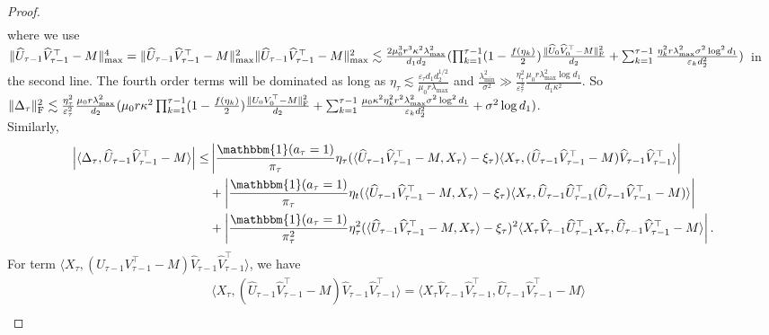 \documentclass[12pt]{article}
\newcommand\fro[1]{\| #1 \|_{\rm{F}}}
\newcommand{\inp}[2]{\langle #1,#2\rangle}
\theoremstyle{plain}
\begin{document}
\begin{proof}
\begin{align*}
    \end{align*}
    where we use $\|\widehat{U}_{\tau-1}\widehat{V}_{\tau-1}^{\top}-M\|_{\max}^4=\|\widehat{U}_{\tau-1}\widehat{V}_{\tau-1}^{\top}-M\|_{\max}^2 \|\widehat{U}_{\tau-1}\widehat{V}_{\tau-1}^{\top}-M\|_{\max}^2\lesssim \frac{2\mu_0^3 r^3\kappa^2 \lambda_{\max}^2}{d_1d_2}(\prod_{k=1}^{\tau-1} (1-\frac{f(\eta_k)}{2})\frac{\fro{\widehat{U}_0\widehat{V}_0^{\top}-M}^2}{d_2} + \sum_{k=1}^{\tau-1}\frac{\eta_k^2r\lambda_{\max}^2\sigma^2\log^2d_1}{\varepsilon_k d_2^2})$ in the second line. The fourth order terms will be dominated as long as $\eta_\tau\lesssim \frac{\varepsilon_\tau d_1d_2^{1/2}}{\mu_0r \lambda_{\max}}$ and $\frac{\lambda_{\min}^2}{\sigma^2}\gg \frac{\eta_{\tau}^2}{\varepsilon_{\tau}^2}\frac{\mu_0r\lambda_{\max}^2\log d_1}{d_1\kappa^2}$. So $\fro{\Delta_\tau}^2\lesssim \frac{\eta_\tau^2}{\varepsilon_\tau^2}\frac{\mu_0r\lambda_{\max}^2}{d_2}(\mu_0r\kappa^2 \prod_{k=1}^{\tau-1} (1-\frac{f(\eta_k)}{2})\frac{\fro{U_0V_0^{\top}-M}^2}{d_2} + \sum_{k=1}^{\tau-1}\frac{\mu_0\kappa^2 \eta_k^2r^2\lambda_{\max}^2\sigma^2\log^2d_1}{\varepsilon_k d_2^2} + \sigma^2\log d_1)$. \\
    Similarly, 
    \begin{align*}
        \left|\inp{\Delta_\tau}{\widehat{U}_{\tau-1}\widehat{V}_{\tau-1}^{\top}-M}\right|\leq &\left|\frac{\mathbbm{1}(a_\tau=1)}{\pi_\tau}\eta_\tau (\inp{\widehat{U}_{\tau-1}\widehat{V}_{\tau-1}^{\top} - M}{X_\tau}-\xi_\tau)\inp{X_\tau}{(\widehat{U}_{\tau-1}\widehat{V}_{\tau-1}^{\top} - M)\widehat{V}_{\tau-1}\widehat{V}_{\tau-1}^{\top}}\right|\\ &+ \left|\frac{\mathbbm{1}(a_\tau=1)}{\pi_\tau}\eta_t (\inp{\widehat{U}_{\tau-1}\widehat{V}_{\tau-1}^{\top} - M}{X_\tau}-\xi_\tau)\inp{X_\tau}{\widehat{U}_{\tau-1}\widehat{U}_{\tau-1}^{\top}(\widehat{U}_{\tau-1}\widehat{V}_{\tau-1}^{\top} - M)}\right| \\ &+  \left|\frac{\mathbbm{1}(a_\tau=1)}{\pi_\tau^2}\eta_\tau^2 (\inp{\widehat{U}_{\tau-1}\widehat{V}_{\tau-1}^{\top} - M}{X_\tau}-\xi_\tau)^2\inp{X_\tau \widehat{V}_{\tau-1}\widehat{U}_{\tau-1}^{\top}X_\tau}{\widehat{U}_{\tau-1}\widehat{V}_{\tau-1}^{\top} - M}\right|.
    \end{align*}
    For term $\inp{X_\tau}{(U_{\tau-1}V_{\tau-1}^{\top} - M)\widehat{V}_{\tau-1}\widehat{V}_{\tau-1}^{\top}}$, we have
    \begin{align*}
        &\inp{X_\tau}{(\widehat{U}_{\tau-1}\widehat{V}_{\tau-1}^{\top} - M)\widehat{V}_{\tau-1}\widehat{V}_{\tau-1}^{\top}}= \inp{X_\tau\widehat{V}_{\tau-1}\widehat{V}_{\tau-1}^{\top}}{\widehat{U}_{\tau-1}\widehat{V}_{\tau-1}^{\top} - M} \\

\end{align*}
\end{proof}
\end{document}
